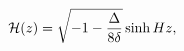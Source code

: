 \begin{equation}
{\cal H}(z)= \sqrt{-1-\frac{\Delta}{8 \delta}} \sinh{H z},
\label{eq:background_negative} 
\end{equation}

